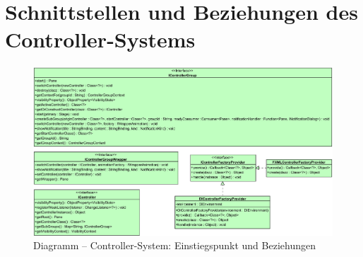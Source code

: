 \chapter{Schnittstellen und Beziehungen des Controller-Systems}
\label{appendix:controller_system}
\begin{figure}[H]
	\centering
	\includegraphics[angle=90,height=\textheight-2.2cm]{Abbildungen/Controller-System-Full.png}
	\caption*{Diagramm -- Controller-System: Einstiegspunkt und Beziehungen}
\end{figure}